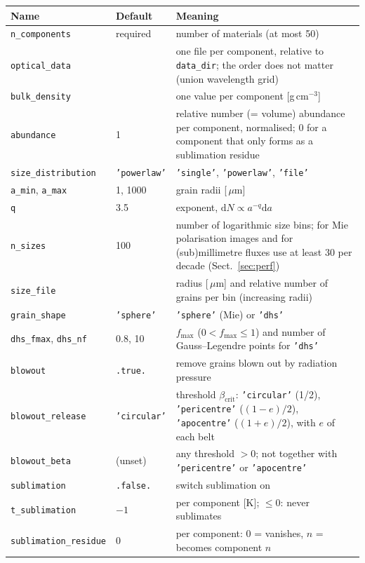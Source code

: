 \documentclass[11pt,a4paper]{article}
\newcommand{\code}[1]{\texttt{#1}}
\newcommand{\um}{\,$\mu$m}
\newcommand{\dd}{\mathrm{d}}
\begin{document}
\small
\begin{longtable}{@{}R{4.15cm}R{3.4cm}R{7.45cm}@{}}
\toprule
Name & Default & Meaning \\
\midrule
\endhead
\code{n\_components} & required & number of materials (at most 50) \\
\code{optical\_data} & & one file per component, relative to \code{data\_dir}; the order does not
  matter (union wavelength grid) \\
\code{bulk\_density} & & one value per component [g\,cm$^{-3}$] \\
\code{abundance} & 1 & relative number (= volume) abundance per component, normalised; 0 for a
  component that only forms as a sublimation residue \\
\code{size\_distribution} & \code{'powerlaw'} & \code{'single'}, \code{'powerlaw'}, \code{'file'} \\
\code{a\_min}, \code{a\_max} & 1, 1000 & grain radii [\um] \\
\code{q} & 3.5 & exponent, $\dd N\propto a^{-q}\dd a$ \\
\code{n\_sizes} & 100 & number of logarithmic size bins; for Mie polarisation images and for
  (sub)millimetre fluxes use at least 30 per decade (Sect.~\ref{sec:perf}) \\
\code{size\_file} & & radius [\um] and relative number of grains per bin (increasing radii) \\
\code{grain\_shape} & \code{'sphere'} & \code{'sphere'} (Mie) or \code{'dhs'} \\
\code{dhs\_fmax}, \code{dhs\_nf} & 0.8, 10 & $f_\mathrm{max}$ ($0<f_\mathrm{max}\le1$) and number of
  Gauss--Legendre points for \code{'dhs'} \\
\code{blowout} & \code{.true.} & remove grains blown out by radiation pressure \\
\code{blowout\_release} & \code{'circular'} & threshold $\beta_\mathrm{crit}$: \code{'circular'}
  (1/2), \code{'pericentre'} ($(1-e)/2$), \code{'apocentre'} ($(1+e)/2$), with $e$ of each belt \\
\code{blowout\_beta} & (unset) & any threshold $>0$; not together with \code{'pericentre'} or
  \code{'apocentre'} \\
\code{sublimation} & \code{.false.} & switch sublimation on \\
\code{t\_sublimation} & $-1$ & per component [K]; $\le0$: never sublimates \\
\code{sublimation\_residue} & 0 & per component: 0 = vanishes, $n$ = becomes component $n$ \\

\end{longtable}
\end{document}
